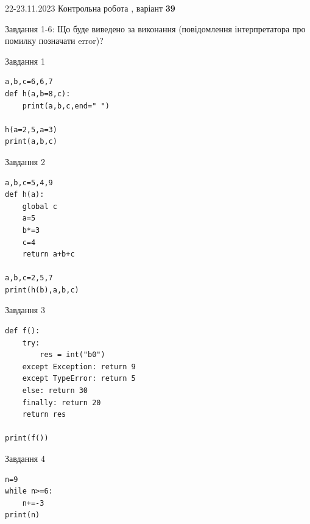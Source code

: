 \documentclass[12pt, ukrainian]{article}
\begin{document}
{{22-23.11.2023 Контрольна робота , варіант  \No \textbf { 39 }\par}}
{

Завдання 1-6: Що буде виведено за виконання (повідомлення інтерпретатора про помилку позначати error)?


\begin{minipage}[t]{9.7cm}                
{\begin{center}Завдання {1}\end{center}}
\begin{verbatim}
a,b,c=6,6,7
def h(a,b=8,c):
    print(a,b,c,end=" ")

h(a=2,5,a=3)
print(a,b,c)
\end{verbatim}     
\end{minipage}
\vline \hspace{8mm}
\begin{minipage}[t]{8.0cm}                
{\begin{center}Завдання {2}\end{center}}
\begin{verbatim}
a,b,c=5,4,9
def h(a):
    global c
    a=5
    b*=3
    c=4
    return a+b+c

a,b,c=2,5,7
print(h(b),a,b,c)
\end{verbatim}     
\end{minipage}

\vspace{15mm}
\begin{minipage}[t]{9.7cm}                
{\begin{center}Завдання {3}\end{center}}
\begin{verbatim}
def f():
    try:
        res = int("b0")
    except Exception: return 9
    except TypeError: return 5
    else: return 30
    finally: return 20
    return res

print(f())
\end{verbatim}     
\end{minipage}
\vline \hspace{8mm}
\begin{minipage}[t]{8.0cm}                
{\begin{center}Завдання {4}\end{center}}
\begin{verbatim}
n=9
while n>=6:
    n+=-3
print(n)
\end{verbatim}     
\end{minipage}

}
\end{document}
